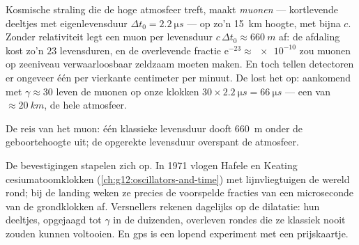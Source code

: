 \begin{example}\label{ex:g12:special-relativity:muons}
Kosmische straling die de hoge atmosfeer treft, maakt \emph{muonen} ---
kortlevende deeltjes met eigenlevensduur $\Delta t_0 = \qty{2.2}{\micro s}$ ---
op zo'n \qty{15}{km} hoogte, met bijna $c$. Zonder relativiteit legt een muon
per levensduur $c\,\Delta t_0 \approx \qty{660}{m}$ af: de afdaling kost zo'n
$23$ levensduren, en de overlevende fractie
$\mathrm{e}^{-23} \approx \num{e-10}$ zou muonen op zeeniveau verwaarloosbaar
zeldzaam moeten maken. En toch tellen detectoren er ongeveer één per vierkante
centimeter per minuut. De  lost het op: aankomend met
$\gamma \approx 30$ leven de muonen op onze klokken
$30 \times \qty{2.2}{\micro s} = \qty{66}{\micro s}$ --- een  van
$\approx \qty{20}{km}$, de hele atmosfeer.
\end{example}

\begin{omfigure}

{\small De reis van het muon: één klassieke levensduur dooft \qty{660}{m} onder
de geboortehoogte uit; de opgerekte levensduur overspant de atmosfeer.}
\end{omfigure}

De bevestigingen stapelen zich op. In 1971 vlogen Hafele en Keating
cesiumatoomklokken (\cref{ch:g12:oscillators-and-time}) met lijnvliegtuigen de
wereld rond; bij de landing weken ze precies de voorspelde fracties van een
microseconde van de grondklokken af. Versnellers rekenen dagelijks op de
dilatatie: hun deeltjes, opgejaagd tot $\gamma$ in de duizenden, overleven
rondes die ze klassiek nooit zouden kunnen voltooien. En gps is een lopend
experiment met een prijskaartje.

